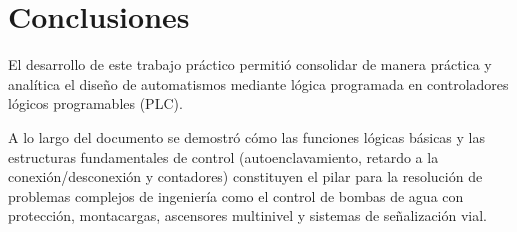 \chapter{Conclusiones}

El desarrollo de este trabajo práctico permitió consolidar de manera práctica y analítica el diseño de automatismos
mediante lógica programada en controladores lógicos programables (PLC).

A lo largo del documento se demostró cómo las funciones lógicas básicas y las estructuras fundamentales de control
(autoenclavamiento, retardo a la conexión/desconexión y contadores) constituyen el pilar para la resolución de
problemas complejos de ingeniería como el control de bombas de agua con protección, montacargas, ascensores multinivel y
sistemas de señalización vial.
